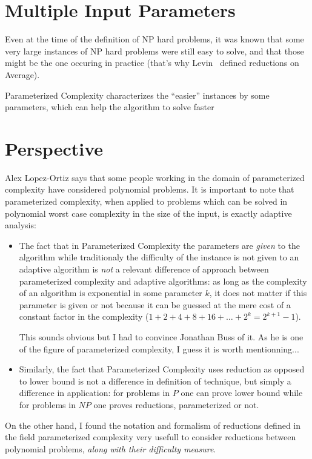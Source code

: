 \section{Multiple Input Parameters}
\label{sec:mult-input-param}

Even at the time of the definition of NP hard problems, it was known
that some very large instances of NP hard problems were still easy to
solve, and that those might be the one occuring in practice (that's
why Levin~\cite{levin} defined reductions on Average).



Parameterized Complexity characterizes the ``easier'' instances by
some parameters, which can help the algorithm to solve faster






\section{Perspective}
\label{sec:perspective-parameterized-complexity}

Alex Lopez-Ortiz says that some people working in the domain of
parameterized complexity have considered polynomial problems.
%
It is important to note that parameterized complexity, when applied to
problems which can be solved in polynomial worst case complexity in
the size of the input, is exactly adaptive analysis:
\begin{itemize}
\item The fact that in Parameterized Complexity the parameters are
  \emph{given} to the algorithm while traditionaly the difficulty of
  the instance is not given to an adaptive algorithm is \emph{not} a
  relevant difference of approach between parameterized complexity and
  adaptive algorithms: as long as the complexity of an algorithm is
  exponential in some parameter $k$, it does not matter if this
  parameter is given or not because it can be guessed at the mere cost
  of a constant factor in the complexity
  ($1+2+4+8+16+\ldots+2^k=2^{k+1}-1$).
%
  \begin{NOTE}
    This sounds obvious but I had to convince Jonathan Buss of it. As
    he is one of the figure of parameterized complexity, I guess it is
    worth mentionning...
  \end{NOTE}

\item Similarly, the fact that Parameterized Complexity uses reduction
  as opposed to lower bound is not a difference in definition of
  technique, but simply a difference in application: for problems in
  $P$ one can prove lower bound while for problems in $NP$ one proves
  reductions, parameterized or not.

\end{itemize}


On the other hand, I found the notation and formalism of reductions
defined in the field parameterized complexity very usefull to consider
reductions between polynomial problems, \emph{along with their
  difficulty measure}.




